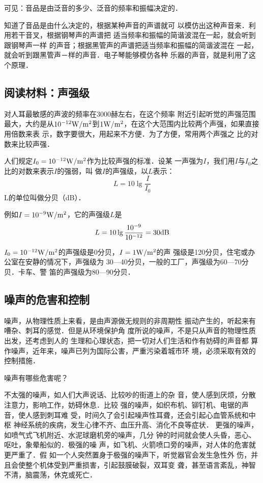 可见：音品是由泛音的多少、泛音的频率和振幅决定的．

知道了音品是由什么决定的，根据某种声音的声谱就可
以模仿出这种声音来．利用若干音叉，根据钢琴声的声谱把
适当频率和振幅的简谐波混在一起，就会听到跟钢琴声一样
的声音；根据黑管声的声谱把适当频率和振幅的简谐波混在
一起，就会听到跟黑管声－样的声音．电子琴能够模仿各种
乐器的声音，就是利用了这个原理．


\subsection*{阅读材料：声强级}
对人耳最敏感的声波的频率在3000赫左右，在这个频率
附近引起听觉的声强范围最大，大约是从$10^{-12}{\rm W}/{\rm m^2}$到$1{\rm W}/{\rm m^2}$，在这个大范围内比较两个声强，如果直接用倍数来表
示，数字要很大，用起来不方便．为了方便，常用两个声强之
比的对数来比较声强．

人们规定$I_0=10^{-12}{\rm W}/{\rm m^2}$作为比较声强的标准．设某
一声强为$I$，我们用$I$与$I_0$之比的对数来表示$I$的强弱，叫
做$I$的声强级，以$L$表示：
\[L=10\lg \frac{I}{I_0} \]
L的单位叫做分贝（dB）．

例如$I=10^{-9}{\rm W}/{\rm m^2}$，它的声强级$L$是
\[L=10\lg \frac{10^{-9}}{10^{-12}}=30{\rm dB} \]

$I_0=10^{-12}{\rm W}/{\rm m^2}$的声强级是0分贝，$I=1{\rm W}/{\rm m^2}$的声
强级是120分贝，住宅或办公室在安静的情况下，声强级为
30—40分贝，一般的工厂，声强级为60—70分贝．卡车、警
笛的声强级为80—90分贝．

\subsection{噪声的危害和控制}
噪声，从物理性质上来看，是由声源做无规则的非周期性
振动产生的，听起来有嘈杂、刺耳的感觉．但是从环境保护角
度所说的噪声，不是只从声音的物理性质出发，还考虑到人的
生理和心理状态，把一切对人们生活和作有妨碍的声音都
算作噪声，近年来，噪声已列为国际公害，严重污染着城市环
境，必须采取有效的控制措施．

噪声有哪些危害呢？

不太强的噪声，如人们大声说话、比较吵的街道上的杂
音，使人感到厌烦，分散注意力，影响工作，妨碍休息．比较
强的噪声，如织布机、铆钉机、电锯的声音，使人感到刺耳难
受，时间久了会引起噪声性耳聋，还会引起心血管系统和中枢
神经系统的疾病，发生心律不齐、血压升高、消化不良等症状．
更强的噪声，如喷气式飞机附近、水泥球磨机旁的噪声，几分
钟的时间就会使人头昏，恶心、呕吐，象晕船似的．极强的噪
声，如飞机、火箭喷口旁的噪声，对人体的危害就更严重了．假
如一个人突然置身于极强的噪声下，听觉器官会发生急性外
伤，并且会使整个机体受到严重损害，引起鼓膜破裂，双耳变
聋，甚至语言紊乱，神智不清，脑震荡，休克或死亡．

